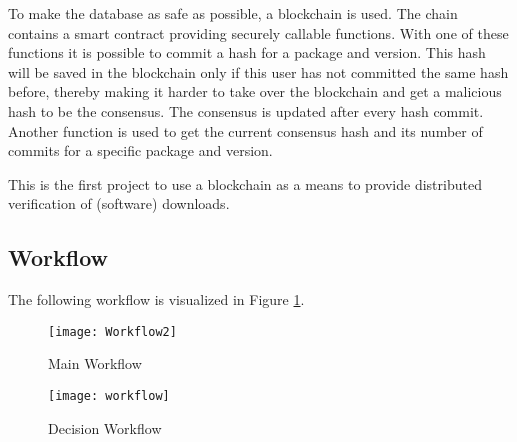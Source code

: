 To make the database as safe as possible, a blockchain is used. The chain contains a smart contract providing securely callable functions. With one of these functions it is possible to commit a hash for a package and version. This hash will be saved in the blockchain only if this user has not committed the same hash before, thereby making it harder to take over the blockchain and get a malicious hash to be the consensus. The consensus is updated after every hash commit. Another function is used to get the current consensus hash and its number of commits for a specific package and version.

This is the first project to use a blockchain as a means to provide distributed verification of (software) downloads.

\subsection*{Workflow}
\label{sec:workflow}
The following workflow is visualized in Figure \ref{fig:main_workflow}.
\begin{figure}
	\centering
		\texttt{[image: Workflow2]}
	\caption{Main Workflow}
	\label{fig:main_workflow}
\end{figure}

\begin{figure}
	\centering
		\texttt{[image: workflow]}
	\caption{Decision Workflow}
	\label{fig:decision_workflow}
\end{figure}


